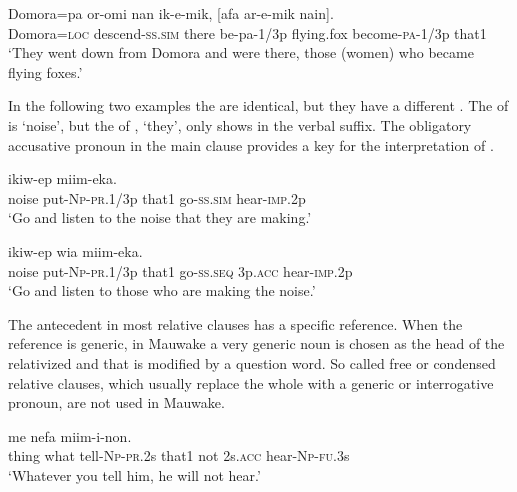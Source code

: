 \ea%
\label{ex:8:x1556}
\gll Domora=pa  or-omi  nan  ik-e-mik,  [afa ar-e-mik  nain]. \\
Domora=\textsc{loc} descend-\textsc{ss}.\textsc{sim} there be-pa-1/3p  flying.fox become-\textsc{pa}-1/3p  that1\\
\glt`They went down from Domora and were there, those (women) who became flying foxes.'
\z


In the following two examples the  are identical, but they have a different . The  of  is  `noise', but the  of ,  `they', only shows in the verbal suffix. The obligatory accusative pronoun in the main clause provides a key for the interpretation of .

\ea%
\label{ex:8:x1557}
  ikiw-ep  miim-eka. \\
noise  put-\textsc{Np}-\textsc{pr}.1/3p that1 go-\textsc{ss}.\textsc{sim} hear-\textsc{imp}.2p\\
\glt`Go and listen to the noise that they are making.'
\z


\ea%
\label{ex:8:x1558}
  ikiw-ep  wia  miim-eka.\\
noise  put-\textsc{Np}-\textsc{pr}.1/3p that1 go-\textsc{ss}.\textsc{seq} 3p.\textsc{acc} hear-\textsc{imp}.2p\\
\glt`Go and listen to those who are making the noise.'
\z


The antecedent in most relative clauses has a specific reference. When the reference is generic, in Mauwake a very generic noun is chosen as the head of the relativized  and that is modified by a question word. So called free \citep[213]{Andrews2007b} or condensed \citep[359]{Dixon2010b} relative clauses, which usually replace the whole  with a generic or interrogative pronoun, are not used in Mauwake. 

\ea%
\label{ex:8:x1562}
  me  nefa  miim-i-non.\\
thing  what  tell-\textsc{Np}-\textsc{pr}.2s that1 not 2s.\textsc{acc} hear-\textsc{Np}-\textsc{fu}.3s\\
\glt`Whatever you tell him, he will not hear.'
\z


